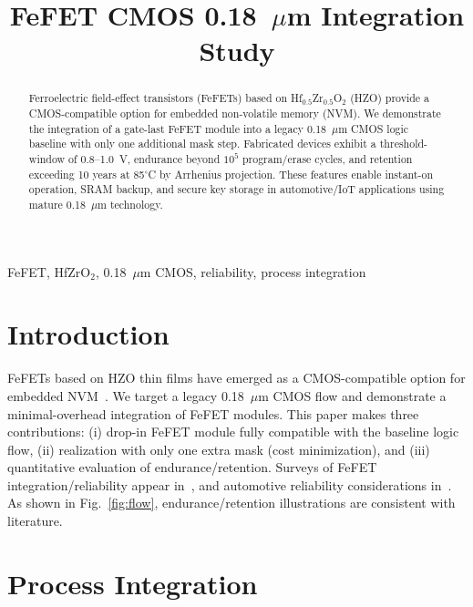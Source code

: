 \documentclass[conference]{IEEEtran}
\begin{document}
\title{FeFET CMOS 0.18~$\mu$m Integration Study}

\author{
}

\maketitle

\begin{abstract}
Ferroelectric field-effect transistors (FeFETs) based on Hf$_{0.5}$Zr$_{0.5}$O$_2$ (HZO) provide a CMOS-compatible option for embedded non-volatile memory (NVM). We demonstrate the integration of a gate-last FeFET module into a legacy 0.18~$\mu$m CMOS logic baseline with only one additional mask step. Fabricated devices exhibit a threshold-window of 0.8--1.0~V, endurance beyond $10^5$ program/erase cycles, and retention exceeding 10 years at 85$^\circ$C by Arrhenius projection. These features enable instant-on operation, SRAM backup, and secure key storage in automotive/IoT applications using mature 0.18~$\mu$m technology.
\end{abstract}

\begin{IEEEkeywords}
FeFET, HfZrO$_2$, 0.18~$\mu$m CMOS, reliability, process integration
\end{IEEEkeywords}

\section{Introduction}
FeFETs based on HZO thin films have emerged as a CMOS-compatible option for embedded NVM~\cite{Boscke2011,Mueller2012,Schenk2019}. We target a legacy 0.18~$\mu$m CMOS flow and demonstrate a minimal-overhead integration of FeFET modules. This paper makes three contributions: (i) drop-in FeFET module fully compatible with the baseline logic flow, (ii) realization with only one extra mask (cost minimization), and (iii) quantitative evaluation of endurance/retention. Surveys of FeFET integration/reliability appear in~\cite{Mueller2015,Park2020}, and automotive reliability considerations in~\cite{Nakamura2003}. As shown in Fig.~\ref{fig:flow}, endurance/retention illustrations are consistent with literature.

\section{Process Integration}
\end{document}
